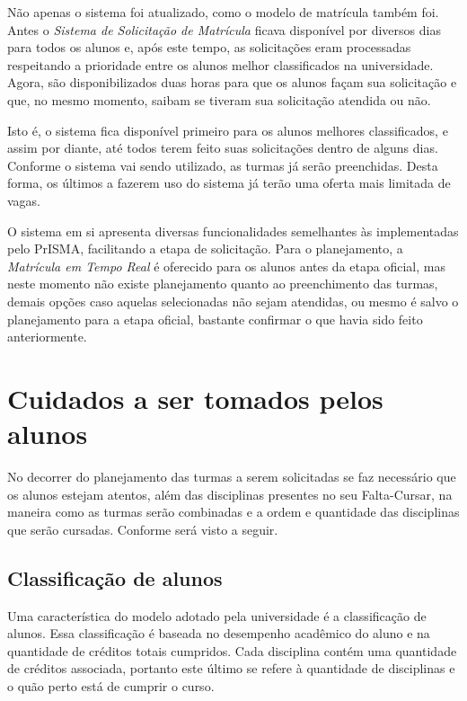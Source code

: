 \documentclass[graduacao,brazil]{ThesisPUC}
\begin{document}
Não apenas o sistema foi atualizado, como o modelo de matrícula também foi. Antes o \textit{Sistema de Solicitação de Matrícula} ficava disponível por diversos dias para todos os alunos e, após este tempo, as solicitações eram processadas respeitando a prioridade entre os alunos melhor classificados na universidade. Agora, são disponibilizados duas horas para que os alunos façam sua solicitação e que, no mesmo momento, saibam se tiveram sua solicitação atendida ou não. 

Isto é, o sistema fica disponível primeiro para os alunos melhores classificados, e assim por diante, até todos terem feito suas solicitações dentro de alguns dias. Conforme o sistema vai sendo utilizado, as turmas já serão preenchidas. Desta forma, os últimos a fazerem uso do sistema já terão uma oferta mais limitada de vagas. 

O sistema em si apresenta diversas funcionalidades semelhantes às implementadas pelo PrISMA, facilitando a etapa de solicitação. Para o planejamento, a \textit{Matrícula em Tempo Real} é oferecido para os alunos antes da etapa oficial, mas neste momento não existe planejamento quanto ao preenchimento das turmas, demais opções caso aquelas selecionadas não sejam atendidas, ou mesmo é salvo o planejamento para a etapa oficial, bastante confirmar o que havia sido feito anteriormente.

\section{Cuidados a ser tomados pelos alunos}

No decorrer do planejamento das turmas a serem solicitadas se faz necessário que os alunos estejam atentos, além das disciplinas presentes no seu Falta-Cursar, na maneira como as turmas serão combinadas e a ordem e quantidade das disciplinas que serão cursadas. Conforme será visto a seguir.

\subsection{Classificação de alunos}

Uma característica do modelo adotado pela universidade é a classificação de alunos. Essa classificação é baseada no desempenho acadêmico do aluno e na quantidade de créditos totais cumpridos. Cada disciplina contém uma quantidade de créditos associada, portanto este último se refere à quantidade de disciplinas e o quão perto está de cumprir o curso. 
\end{document}
